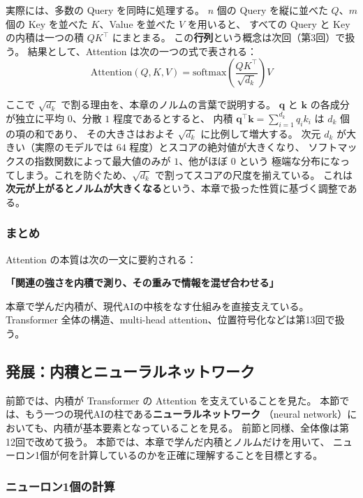 実際には、多数の Query を同時に処理する。
$n$ 個の Query を縦に並べた $Q$、$m$ 個の Key を並べた $K$、Value を並べた $V$ を用いると、
すべての Query と Key の内積は一つの積 $QK^\top$ にまとまる。
この\textbf{行列}という概念は次回（第3回）で扱う。
結果として、Attention は次の一つの式で表される：
\begin{equation}
  \mathrm{Attention}(Q, K, V) = \mathrm{softmax}\!\left( \frac{QK^\top}{\sqrt{d_k}} \right) V
\end{equation}

ここで $\sqrt{d_k}$ で割る理由を、本章のノルムの言葉で説明する。
$\bm{q}$ と $\bm{k}$ の各成分が独立に平均 $0$、分散 $1$ 程度であるとすると、
内積 $\bm{q}^\top \bm{k} = \sum_{i=1}^{d_k} q_i k_i$ は $d_k$ 個の項の和であり、
その大きさはおよそ $\sqrt{d_k}$ に比例して増大する。
次元 $d_k$ が大きい（実際のモデルでは $64$ 程度）とスコアの絶対値が大きくなり、
ソフトマックスの指数関数によって最大値のみが $1$、他がほぼ $0$ という
極端な分布になってしまう。これを防ぐため、$\sqrt{d_k}$ で割ってスコアの尺度を揃えている。
これは\textbf{次元が上がるとノルムが大きくなる}という、本章で扱った性質に基づく調整である。

\subsubsection{まとめ}

Attention の本質は次の一文に要約される：
\begin{center}
  \textbf{「関連の強さを内積で測り、その重みで情報を混ぜ合わせる」}
\end{center}
本章で学んだ内積が、現代AIの中核をなす仕組みを直接支えている。
Transformer 全体の構造、multi-head attention、位置符号化などは第13回で扱う。


\subsection{発展：内積とニューラルネットワーク}

前節では、内積が Transformer の Attention を支えていることを見た。
本節では、もう一つの現代AIの柱である\textbf{ニューラルネットワーク}
（neural network）においても、内積が基本要素となっていることを見る。
前節と同様、全体像は第12回で改めて扱う。
本節では、本章で学んだ内積とノルムだけを用いて、
ニューロン1個が何を計算しているのかを正確に理解することを目標とする。

\subsubsection{ニューロン1個の計算}

